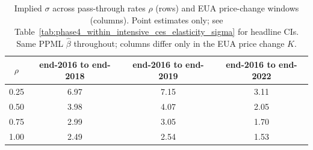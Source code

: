 \begin{table}[ht]
\centering
\caption{Implied $\sigma$ across pass-through rates $\rho$ (rows) and EUA price-change windows (columns). Point estimates only; see Table~\ref{tab:phase4_within_intensive_ces_elasticity_sigma} for headline CIs. Same PPML $\hat\beta$ throughout; columns differ only in the EUA price change $K$.} 
\label{tab:phase4_within_intensive_ces_elasticity_robustness}
\begin{tabular}{cccc}
  \toprule
$\rho$ & end-2016 to end-2018 & end-2016 to end-2019 & end-2016 to end-2022 \\ 
  \midrule
0.25 & 6.97 & 7.15 & 3.11 \\ 
  0.50 & 3.98 & 4.07 & 2.05 \\ 
  0.75 & 2.99 & 3.05 & 1.70 \\ 
  1.00 & 2.49 & 2.54 & 1.53 \\ 
   \bottomrule
\end{tabular}
\end{table}
